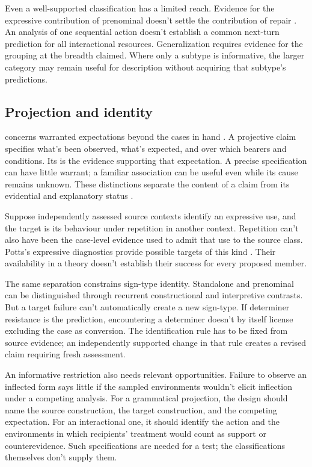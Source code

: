 \documentclass[12pt]{article}
\begin{document}
Even a well-supported classification has a limited reach. Evidence for
the expressive contribution of prenominal  doesn't settle
the contribution of repair . An analysis of one sequential
action doesn't establish a common next-turn prediction for all interactional
resources. Generalization requires evidence for the grouping at the breadth
claimed. Where only a subtype is informative, the larger category may
remain useful for description without acquiring that subtype's predictions.

\subsection{Projection and identity}

 concerns warranted expectations beyond the cases in
hand \citep{Goodman1955}. A projective claim specifies what's been observed,
what's expected, and over which bearers and conditions. Its 
is the evidence supporting that expectation. A precise specification can
have little warrant; a familiar association can be useful even while its
cause remains unknown. These distinctions separate the content of a claim
from its evidential and explanatory status
\citep[11--12]{reynolds2026projectibilityHistory}.

Suppose independently assessed source contexts identify an expressive
use, and the target is its behaviour under repetition in another context.
Repetition can't also have been the case-level evidence used to admit that
use to the source class. Potts's expressive diagnostics provide possible
targets of this kind \citep[166--167]{potts2007}. Their availability in a
theory doesn't establish their success for every proposed member.

The same separation constrains sign-type identity. Standalone and
prenominal  can be distinguished through recurrent
constructional and interpretive contrasts. But a target failure can't
automatically create a new sign-type. If determiner resistance is the
prediction, encountering a determiner doesn't by itself license excluding
the case as conversion. The identification rule has to be fixed from
source evidence; an independently supported change in that rule creates
a revised claim requiring fresh assessment.

An informative restriction also needs relevant opportunities. Failure
to observe an inflected form says little if the sampled environments
wouldn't elicit inflection under a competing analysis. For a grammatical
projection, the design should name the source construction, the target
construction, and the competing expectation. For an interactional one,
it should identify the action and the environments in which recipients'
treatment would count as support or counterevidence. Such specifications
are needed for a test; the classifications themselves don't supply them.
\end{document}
